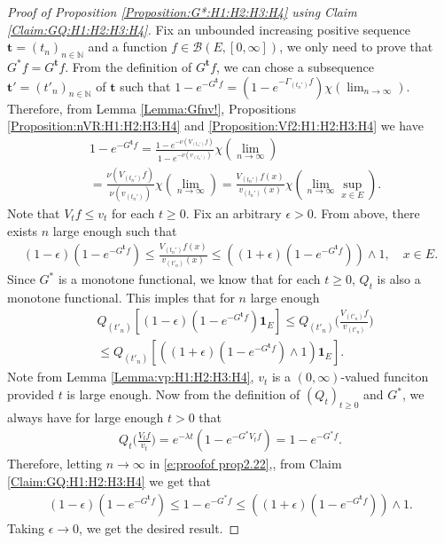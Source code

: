 \documentclass[12pt,a4paper]{amsart}
\numberwithin{equation}{section}
\theoremstyle{plain}
\theoremstyle{definition}
\theoremstyle{remark}
\begin{document}
\begin{proof}[Proof of Proposition \ref{Proposition:G*:H1:H2:H3:H4} using Claim \ref{Claim:GQ:H1:H2:H3:H4}]
Fix an unbounded increasing positive sequence $\mathbf t=(t_n)_{n\in \mathbb N}$ and a function $f\in \mathcal B(E,[0,\infty])$, 
we only need to prove that
$G^* f = G^{\mathbf t}f.$
From the definition of $G^{\mathbf t} f$, we can chose a subsequence $\mathbf t'=(t'_n)_{n \in \mathbb N}$ of $\mathbf t$ such that $ 1 - e^{- G^{\mathbf t}f} =  ( 1 - e^{-\Gamma_{( t_n')} f} ) 
\chi(\lim_{n\to \infty}). $
Therefore, from Lemma \ref{Lemma:Gfnv!}, Propositions \ref{Proposition:nVR:H1:H2:H3:H4} and \ref{Proposition:Vf2:H1:H2:H3:H4} we have
\begin{align}
   & 1 - e^{- G^{\mathbf t}f}
   = \frac{1 - e^{- \nu( V_{(t_n')}f)}}{1- e^{- \nu(v_{(t_n')})}}  \chi(\lim_{n\to \infty})
 \\& = \frac{\nu (V_{(t_n')} f)}{\nu(v_{(t_n')})} \chi(\lim_{n\to \infty})
   =  \frac{V_{(t_n')}f(x)}{v_{(t_n')}(x)}  \chi(\lim_{n \to \infty} \sup_{x\in E}).
 \end{align}
Note that $V_tf \leq v_t$ for each $t\geq 0$.
Fix an arbitrary $\epsilon > 0$.
From above, there exists $n$ large enough such that
\begin{align}
   (1-\epsilon) (1 - e^{- G^{\mathbf t}f} )
   \leq \frac{V_{(t_n')}f(x)}{v_{(t'_n)}(x)}
   \leq ((1+\epsilon) ( 1 - e^{- G^{\mathbf t}f} )) \wedge 1,
   \quad x\in E.
 \end{align}
Since $G^*$ is a monotone functional, we know that for each $t\geq 0$, $Q_t$ is also a monotone functional.
This imples that for $n$ large enough
\begin{align}
 & Q_{(t'_n)}[ (1-\epsilon) (1-e^{-G^{\mathbf t}f})\mathbf 1_E ]
   \leq Q_{(t'_n)}\Big( \frac{V_{(t'_n)}f}{v_{(t'_n)}} \Big)
   \\ &  \leq Q_{(t'_n)}[ ( (1+\epsilon) (1-e^{-G^{\mathbf t}f}) \wedge 1) \mathbf 1_E ].\label{e:proofof prop2.22}
 \end{align}
Note from Lemma \ref{Lemma:vp:H1:H2:H3:H4}, $v_t$ is a $(0,\infty)$-valued funciton provided $t$ is large enough.
Now from the definition of $(Q_t)_{t\geq 0}$ and $G^*$, we always have for large enough $t>0$ that
\begin{align}
 Q_t \Big( \frac{V_tf}{v_t}  \Big)
   = e^{- \lambda t}( 1 - e^{- G^*V_tf}  )
   = 1- e^{- G^* f}.
 \end{align}
Therefore, letting $n \to \infty$ in \eqref{e:proofof prop2.22},, 
from Claim \ref{Claim:GQ:H1:H2:H3:H4}  we get that
\begin{align}
 (1 - \epsilon) (1 - e^{- G^{\mathbf t}f})
   \leq 1 - e^{- G^* f}
   \leq ((1 + \epsilon) (1 - e^{- G^{\mathbf t} f}))\wedge 1.
 \end{align}
Taking $\epsilon \to 0$, we get the desired result.
\end{proof}
\end{document}
